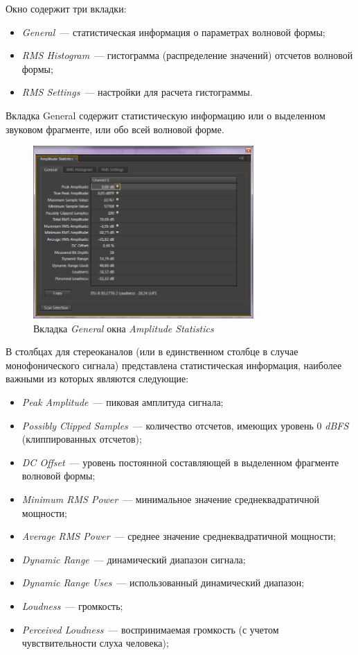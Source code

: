 \documentclass[oneside, final, 14pt]{extreport}
\begin{document}
Окно содержит три вкладки: 
\begin{itemize}
\item \textit{General}~--- статистическая информация о параметрах волновой формы;
\item \textit{RMS Histogram}~--- гистограмма (распределение значений) отсчетов волновой формы;
\item \textit{RMS Settings}~--- настройки для расчета гистограммы.
\end{itemize}

Вкладка General содержит статистическую информацию или о выделенном звуковом фрагменте, или обо всей волновой форме.

\begin{figure}[h]
\centering
\includegraphics[width=0.75\textwidth]{pic-analis-01}
\caption{Вкладка \textit{General} окна \textit{Amplitude Statistics}}
\label{pic-analis-01}
\end{figure}

В столбцах для стереоканалов (или в единственном столбце в
случае монофонического сигнала) представлена статистическая информация, наиболее важными из которых являются следующие:
\begin{itemize}
\item \textit{Peak Amplitude}~--- пиковая амплитуда сигнала;
\item \textit{Possibly Clipped Samples}~--- количество отсчетов, имеющих
уровень 0 \textit{dBFS} (клиппированных отсчетов);
\item \textit{DC Offset}~--- уровень постоянной составляющей в выделенном фрагменте волновой формы;
\item \textit{Minimum RMS Power}~--- минимальное значение среднеквадратичной мощности;
\item \textit{Average RMS Power}~--- среднее значение среднеквадратичной мощности;
\item \textit{Dynamic Range}~--- динамический диапазон сигнала;
\item \textit{Dynamic Range Uses}~--- использованный динамический диапазон;
\item \textit{Loudness}~--- громкость;
\item \textit{Perceived Loudness}~--- воспринимаемая громкость (с учетом чувствительности слуха человека);
\end{itemize}
\end{document}
